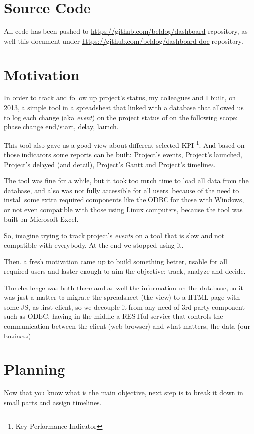 \documentclass[a4paper,12pt,english]{book}
\begin{document}
\chapter*{Source Code}
All code has been pushed to \url{https://github.com/beldog/dashboard}
repository, as well this document under \url{https://github.com/beldog/dashboard-doc} repository.

\chapter*{Motivation}
In order to track and follow up project's status, my colleagues and I
built, on 2013, a simple tool in a spreadsheet that linked with a database that
allowed us to log each change (aka \emph{event}) on the project status of on
the following scope: phase change end/start, delay, launch.

This tool also gave us a good view about different selected KPI \footnote{Key
Performance Indicator}. And based on those indicators some reports can be
built:
Project's events, Project's launched, Project's delayed (and detail), Project's
Gantt and Project's timelines.

The tool was fine for a while, but it took too much time to load all data
from the database, and also was not fully accessible for all users, because
of the need to install some extra required components like the ODBC for those with
Windows, or not even compatible with those using Linux computers, because the
tool was built on Microsoft Excel.

So, imagine trying to track project's \emph{events} on a tool that is slow
and not compatible with everybody. At the end we stopped using it.

Then, a fresh motivation came up to build something better,
usable for all required users and faster enough to aim the objective: track,
analyze and decide. 

The challenge was both there and as well the information on the database, so it
was just a matter to migrate the spreadsheet (the view) to a HTML page with some JS,
as first client, so we decouple it from any need of 3rd party component such as
ODBC, having in the middle a RESTful service that
controls the communication between the client (web browser) and what matters,
the data (our business).

\chapter*{Planning}
Now that you know what is the main objective, next step is to break it down in
small parts and assign timelines.
\end{document}
